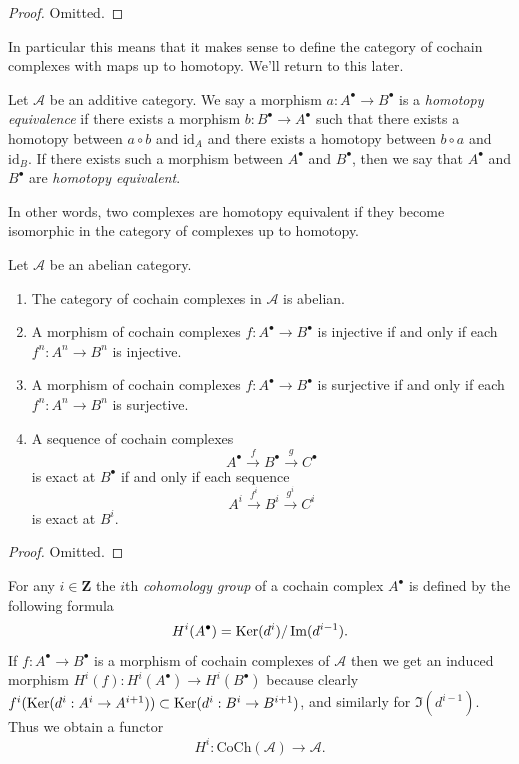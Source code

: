 \begin{proof}
Omitted.
\end{proof}

\noindent
In particular this means that it makes sense
to define
the category of cochain complexes with maps
up to homotopy.
We'll return to this later.

\begin{definition}
\label{definition-homot-equiv-cocha}
Let $\mathcal{A}$ be an additive category.
We say a morphism $a : A^\bullet \to
B^\bullet$
is a {\it homotopy equivalence} if there
exists
a morphism $b : B^\bullet \to A^\bullet$
such that there exists a homotopy between
$a \circ b$ and $\text{id}_A$
and there exists a homotopy between $b \circ
a$ and $\text{id}_B$.
If there exists such a morphism between
$A^\bullet$ and $B^\bullet$, then
we say that $A^\bullet$ and $B^\bullet$ are
{\it homotopy equivalent}.
\end{definition}

\noindent
In other words, two complexes are homotopy
equivalent if they become
isomorphic in the category of complexes up to
homotopy.

\begin{lemma}
\label{lemma-cat-cochain-abelian}
Let $\mathcal{A}$ be an abelian category.
\begin{enumerate}
\item The category of cochain complexes in
$\mathcal{A}$ is
abelian.
\item A morphism of cochain complexes
$f : A^\bullet \to B^\bullet$ is injective
if and only if each $f^n : A^n \to B^n$ is
injective.
\item A morphism of cochain complexes
$f : A^\bullet \to B^\bullet$ is surjective
if and only if each $f^n : A^n \to B^n$ is
surjective.
\item A sequence of cochain complexes
$$
A^\bullet \xrightarrow{f} B^\bullet
\xrightarrow{g} C^\bullet
$$
is exact at $B^\bullet$ if and only if each
sequence
$$
A^i \xrightarrow{f^i} B^i \xrightarrow{g^i}
C^i
$$
is exact at $B^i$.
\end{enumerate}
\end{lemma}

\begin{proof}
Omitted.
\end{proof}

\noindent
For any $i \in \mathbf{Z}$ the $i$th {\it
cohomology group}
of a cochain complex $A^\bullet$ is defined
by
the following formula
$$
H^i(A^\bullet) = \mathop{\mathrm{Ker}}(d^i)/\mathop{\mathrm{Im}}(d^{i - 1}).
$$
If $f : A^\bullet \to B^\bullet$ is a
morphism of cochain
complexes of $\mathcal{A}$ then we get an
induced
morphism $H^i(f) : H^i(A^\bullet) \to
H^i(B^\bullet)$
because clearly
$f^i(\mathop{\mathrm{Ker}}(d^i : A^i \to A^{i + 1})) \subset
\mathop{\mathrm{Ker}}(d^i : B^i \to B^{i + 1})$, and similarly
for $\Im(d^{i - 1})$.
Thus we obtain a functor
$$
H^i : \text{CoCh}(\mathcal{A})
\longrightarrow \mathcal{A}.
$$


